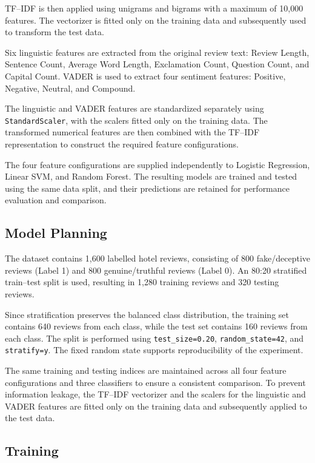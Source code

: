 \documentclass[12pt,a4paper]{report}
\begin{document}
TF--IDF is then applied using unigrams and bigrams with a maximum of
10,000 features. The vectorizer is fitted only on the training data
and subsequently used to transform the test data.

Six linguistic features are extracted from the original review text:
Review Length, Sentence Count, Average Word Length, Exclamation Count,
Question Count, and Capital Count. VADER is used to extract four
sentiment features: Positive, Negative, Neutral, and Compound.

The linguistic and VADER features are standardized separately using
\texttt{StandardScaler}, with the scalers fitted only on the training
data. The transformed numerical features are then combined with the
TF--IDF representation to construct the required feature
configurations.

The four feature configurations are supplied independently to
Logistic Regression, Linear SVM, and Random Forest. The resulting
models are trained and tested using the same data split, and their
predictions are retained for performance evaluation and comparison.

\subsection{Model Planning}

The dataset contains 1,600 labelled hotel reviews, consisting of 800
fake/deceptive reviews (Label 1) and 800 genuine/truthful reviews
(Label 0). An 80:20 stratified train--test split is used, resulting in
1,280 training reviews and 320 testing reviews.

Since stratification preserves the balanced class distribution, the
training set contains 640 reviews from each class, while the test set
contains 160 reviews from each class. The split is performed using
\texttt{test\_size=0.20}, \texttt{random\_state=42}, and
\texttt{stratify=y}. The fixed random state supports reproducibility
of the experiment.

The same training and testing indices are maintained across all four
feature configurations and three classifiers to ensure a consistent
comparison. To prevent information leakage, the TF--IDF vectorizer and
the scalers for the linguistic and VADER features are fitted only on
the training data and subsequently applied to the test data.

\subsection{Training}
\end{document}

